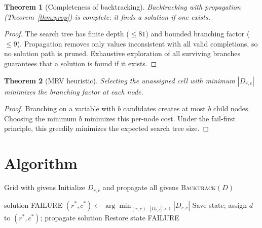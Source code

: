 \documentclass[12pt]{article}
\newtheorem{theorem}{Theorem}
\begin{document}
\begin{theorem}[Completeness of backtracking]
\label{thm:complete}
Backtracking with propagation (Theorem~\ref{thm:prop}) is complete: it finds a solution if one exists.
\end{theorem}
\begin{proof}
The search tree has finite depth ($\le 81$) and bounded branching factor ($\le 9$). Propagation removes only values inconsistent with all valid completions, so no solution path is pruned. Exhaustive exploration of all surviving branches guarantees that a solution is found if it exists.
\end{proof}

\begin{theorem}[MRV heuristic]
Selecting the unassigned cell with minimum $|D_{r,c}|$ minimizes the branching factor at each node.
\end{theorem}
\begin{proof}
Branching on a variable with $b$ candidates creates at most $b$ child nodes. Choosing the minimum $b$ minimizes this per-node cost. Under the fail-first principle, this greedily minimizes the expected search tree size.
\end{proof}

\section{Algorithm}

\begin{algorithm}[H]
\caption{Sudoku solver: constraint propagation + backtracking}
\begin{algorithmic}[1]
\REQUIRE Grid with givens
\STATE Initialize $D_{r,c}$ and propagate all givens
\RETURN \textsc{Backtrack}$(D)$
\end{algorithmic}
\end{algorithm}

\begin{algorithm}[H]
\caption{\textsc{Backtrack}$(D)$}
\begin{algorithmic}[1]
 \RETURN solution \ENDIF
{} \RETURN FAILURE \ENDIF
\STATE $(r^*,c^*) \gets \arg\min_{(r,c):\;|D_{r,c}|>1} |D_{r,c}|$ 
    \STATE Save state; assign $d$ to $(r^*,c^*)$; propagate
     \RETURN solution \ENDIF
    \STATE Restore state
\ENDFOR
\RETURN FAILURE
\end{algorithmic}
\end{algorithm}
\end{document}
